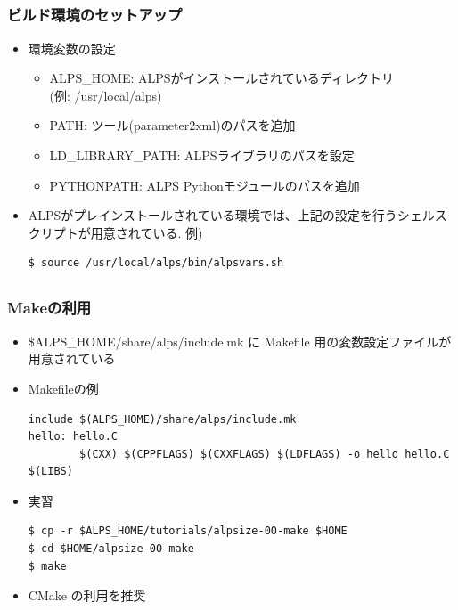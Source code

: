 \subsection*{\redm\whitem\greenb}
\begin{frame}[c,fragile]
  \frametitle{ビルド環境のセットアップ}
  \begin{itemize}
    \setlength{\itemsep}{1em}
  \item 環境変数の設定
    \begin{itemize}
    \item {\color{red} ALPS\_HOME}: ALPSがインストールされているディレクトリ\\ (例: /usr/local/alps)
    \item {\color{red} PATH}: ツール(parameter2xml)のパスを追加
    \item {\color{red} LD\_LIBRARY\_PATH}: ALPSライブラリのパスを設定
    \item {\color{red} PYTHONPATH}: ALPS Pythonモジュールのパスを追加
    \end{itemize}
  \item ALPSがプレインストールされている環境では、上記の設定を行うシェルスクリプトが用意されている. 例)
\begin{lstlisting}
$ source /usr/local/alps/bin/alpsvars.sh
\end{lstlisting}
  \end{itemize}
\end{frame}

\subsection*{\redm\whitem\greenb}
\begin{frame}[c,fragile]
  \frametitle{Makeの利用}
  \begin{itemize}
  \item \$ALPS\_HOME/share/alps/include.mk に Makefile 用の変数設定ファイルが用意されている
  \item Makefileの例
\begin{lstlisting}
include $(ALPS_HOME)/share/alps/include.mk
hello: hello.C
        $(CXX) $(CPPFLAGS) $(CXXFLAGS) $(LDFLAGS) -o hello hello.C $(LIBS)
\end{lstlisting}
  \item 実習
\begin{lstlisting}
$ cp -r $ALPS_HOME/tutorials/alpsize-00-make $HOME
$ cd $HOME/alpsize-00-make
$ make
\end{lstlisting}
  \item {\color{blue} CMake の利用を推奨}
  \end{itemize}
\end{frame}

